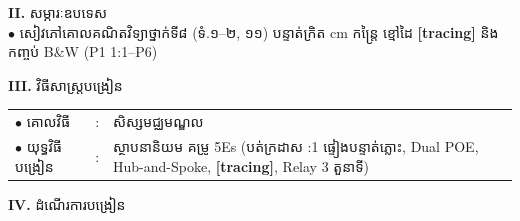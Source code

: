 \documentclass[a4paper,10pt]{article}
\newcommand{\en}[1]{{\TimesEn #1}}
\begin{document}
{\vspace{2pt}

\textbf{II.} {\muol សម្ភារៈឧបទេស}\\[2pt]
\hspace*{0.55cm}$\bullet$ \hspace{0.35cm} សៀវភៅគោលគណិតវិទ្យាថ្នាក់ទី៨ (ទំ.១--២, ១១) បន្ទាត់ក្រិត \en{cm} កន្ត្រៃ ខ្មៅដៃ \textbf{[tracing]} និងកញ្ចប់ \en{B\&W} (\en{P1 1:1}--\en{P6})

\vspace{2pt}

\textbf{III.} {\muol វិធីសាស្រ្តបង្រៀន}\\[2pt]
\hspace*{0.55cm}%
\begin{tabular}{@{}l l L{13.8cm}@{}}
  $\bullet$ \hspace{0.35cm} គោលវិធី & : \hspace{0.7cm} & សិស្សមជ្ឈមណ្ឌល \\
  $\bullet$ \hspace{0.35cm} យុទ្ធវិធីបង្រៀន & : & ស្ថាបនានិយម គម្រូ \en{5Es} (បត់ក្រដាស \en{1:1} ផ្ទៀងបន្ទាត់ភ្លោះ, \en{Dual POE}, \en{Hub-and-Spoke}, \textbf{[tracing]}, \en{Relay 3} តួនាទី) \\
\end{tabular}
}

\vspace{2pt}

\textbf{IV.} {\muol ដំណើរការបង្រៀន}

\vspace{-3pt}
\end{document}
